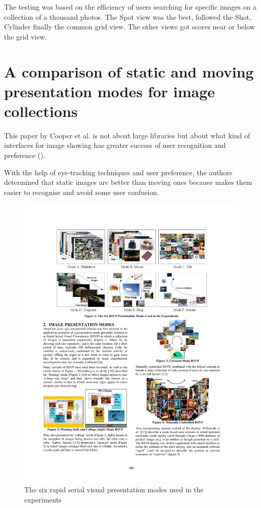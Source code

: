The testing was based on the efficiency of users searching for specific images on a collection of a thousand photos. The Spot view was the best, followed the Shot, Cylinder finally the common grid view. The other views got scores near or below the grid view.


\section{A comparison of static and moving presentation modes for image collections} %
\label{sub:Cooper}

This paper \cite{Cooper:2006p543} by Cooper et al. is not about large libraries but about what kind of interfaces for image showing has greater success of user recognition and preference ().

With the help of eye-tracking techniques and user preference, the authors determined that static images are better than moving ones because makes them easier to recognise and avoid some user confusion.

\begin{figure}[ht]
	\centering
		\includegraphics[width=\textwidth]{imgs-RelatedWork/Cooper1}
	\caption{The six rapid serial visual presentation modes used in the experiments}
	\label{fig:Cooper1}
\end{figure}

